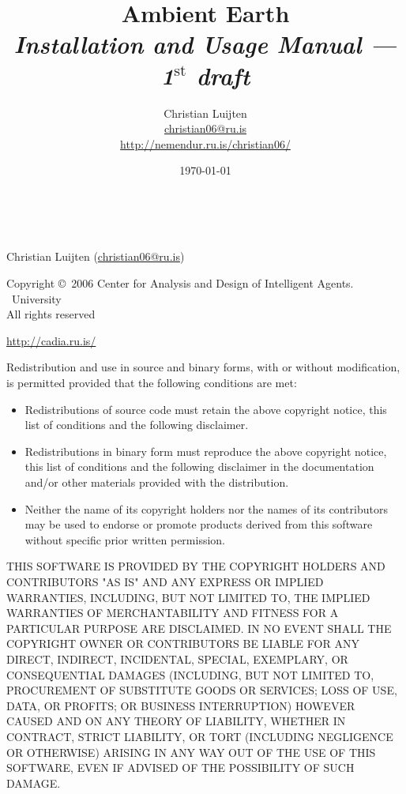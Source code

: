 \documentclass[english,a4paper,twoside]{scrreprt}
\title{Ambient Earth\\
       {\Large \emph{Installation and Usage Manual --- 1$^{\text{st}}$ draft\/}}}
\author{Christian Luijten\\\url{christian06@ru.is}\\\url{http://nemendur.ru.is/christian06/}}
\date{\today}
\begin{document}

\maketitle

\mbox{} \\
\vfill

\begin{adjustwidth}{4em}{4em}
{\scriptsize
  Christian Luijten (\url{christian06@ru.is})

  Copyright \copyright\ 2006 Center for Analysis and Design of Intelligent
  Agents. \\
  \Rvk\ University \\
  All rights reserved

  \url{http://cadia.ru.is/}

  Redistribution and use in source and binary forms, with or without
  modification, is permitted provided that the following conditions are met:

  \begin{itemize}
    \item Redistributions of source code must retain the above copyright
      notice, this list of conditions and the following disclaimer.

    \item Redistributions in binary form must reproduce the above copyright
      notice, this list of conditions and the following disclaimer in the
      documentation and/or other materials provided with the distribution.

    \item Neither the name of its copyright holders nor the names of its
      contributors may be used to endorse or promote products derived from this
      software without specific prior written permission.

  \end{itemize}

  THIS SOFTWARE IS PROVIDED BY THE COPYRIGHT HOLDERS AND CONTRIBUTORS "AS IS"
  AND ANY EXPRESS OR IMPLIED WARRANTIES, INCLUDING, BUT NOT LIMITED TO, THE
  IMPLIED WARRANTIES OF MERCHANTABILITY AND FITNESS FOR A PARTICULAR PURPOSE
  ARE DISCLAIMED. IN NO EVENT SHALL THE COPYRIGHT OWNER OR CONTRIBUTORS BE
  LIABLE FOR ANY DIRECT, INDIRECT, INCIDENTAL, SPECIAL, EXEMPLARY, OR
  CONSEQUENTIAL DAMAGES (INCLUDING, BUT NOT LIMITED TO, PROCUREMENT OF
  SUBSTITUTE GOODS OR SERVICES; LOSS OF USE, DATA, OR PROFITS; OR BUSINESS
  INTERRUPTION) HOWEVER CAUSED AND ON ANY THEORY OF LIABILITY, WHETHER IN
  CONTRACT, STRICT LIABILITY, OR TORT (INCLUDING NEGLIGENCE OR OTHERWISE)
  ARISING IN ANY WAY OUT OF THE USE OF THIS SOFTWARE, EVEN IF ADVISED OF THE
  POSSIBILITY OF SUCH DAMAGE.
}
\end{adjustwidth}

\tableofcontents








\end{document}
